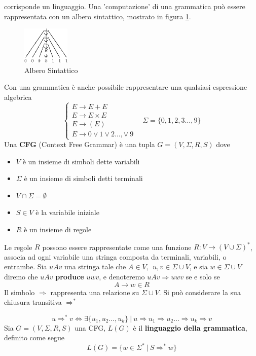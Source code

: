 \documentclass[10pt, letterpaper]{report}
\begin{document}
corrisponde un linguaggio. Una 'computazione' di una grammatica può 
essere rappresentata con un albero sintattico, mostrato in figura \ref{fig:alsint}.\acc
\begin{figure}[h!]
    \centering 
    \includegraphics[width=0.2\textwidth ]{images/alberoSintattico.eps}
    \caption{Albero Sintattico}
    \label{fig:alsint}
\end{figure}\acc
Con una grammatica è anche possibile rappresentare una qualsiasi 
espressione algebrica 
$$ 
\begin{cases}
    E \longrightarrow E + E \\ 
    E \longrightarrow  E \times E \\ 
    E \longrightarrow (E)\\ 
    E \longrightarrow 0 \lor 1 \lor 2 \dots, \lor \ 9 
\end{cases} \ \ \ \ \Sigma=\{0,1,2,3\dots,9\}
$$
 Una \textbf{CFG} (Context Free Grammar) 
è una tupla $G=(V,\Sigma, R, S)$ dove\begin{itemize}
    \item $V$ è un insieme di simboli dette variabili 
    \item $\Sigma$ è un insieme di simboli detti terminali 
    \item $V\cap \Sigma = \emptyset$
    \item $S\in V$ è la variabile iniziale 
    \item $R$ è un insieme di regole
\end{itemize}
Le regole $R$ possono essere rappresentate come una funzione 
$R : V \rightarrow (V\cup \Sigma)^*$, associa ad ogni variabile una 
stringa composta da terminali, variabili, o entrambe.\acc 
Sia $uAv$ una stringa tale che $A\in V, \ \ u,v\in \Sigma \cup V$, e sia 
$w\in \Sigma \cup V$ diremo che 
$uAv$ \textbf{produce} $uwv$, e denoteremo $uAv \Rightarrow  uwv$ se e solo se
 $$ A\longrightarrow w \in R$$
 Il simbolo $ \Rightarrow $ rappresenta una relazione su $\Sigma \cup V$.
 Si può considerare la sua chiusura transitiva $\Rightarrow^*$

 $$u\Rightarrow^* v \iff \exists \{u_1,u_2\dots,u_k\} \ | \  
 u\Rightarrow u_1 \Rightarrow u_2 \dots \Rightarrow u_k \Rightarrow v$$ 
Sia $G=(V,\Sigma, R, S)$ una CFG, $L(G)$ è il \textbf{linguaggio della grammatica}, 
definito come segue 
$$L(G)= \{w\in\Sigma^*\ | \ S\Rightarrow^* w\}$$
\end{document}
